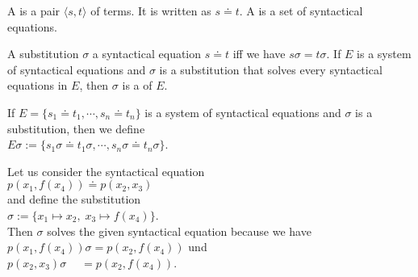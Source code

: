 \begin{Definition} 
  A   is a pair $\langle s, t \rangle$ of terms.
  It is written as $s \doteq t$. 
  A   is a set of syntactical
  equations.
  \eoxs
\end{Definition}


\begin{Definition}[Unifier]
  A substitution $\sigma$  a syntactical equation $s \doteq t$ iff we have $s\sigma = t\sigma$.
  If $E$ is a system of syntactical equations and $\sigma$ is a substitution that solves
  every syntactical equations in $E$, then $\sigma$ is a    of $E$.
  \eoxs
\end{Definition}

\noindent
If $E = \{ s_1 \doteq t_1, \cdots, s_n \doteq t_n \}$ is a system of syntactical equations and $\sigma$ is a
substitution, then we define
\\[0.2cm]
\hspace*{1.3cm}  $E\sigma := \{ s_1\sigma \doteq t_1\sigma, \cdots, s_n\sigma \doteq t_n\sigma \}$.
\vspace{0.3cm}

\example
Let us consider the syntactical equation
\\[0.2cm]
\hspace*{1.3cm}
$p(x_1, f(x_4)) \doteq p( x_2, x_3)$
\\[0.2cm]
and define the substitution
\\[0.2cm]
\hspace*{1.3cm}
$\sigma := \{ x_1 \mapsto x_2,\; x_3 \mapsto f(x_4) \}$.
\\[0.2cm]
Then $\sigma$ solves the given syntactical equation because we have
\\[0.2cm]
\hspace*{1.3cm}
$p(x_1, f(x_4))\sigma = p(x_2, f(x_4))$ \quad und \quad \\[0.2cm]
\hspace*{1.3cm}
$p(x_2, x_3)\sigma \;\quad = p(x_2, f(x_4))$.  \eox

